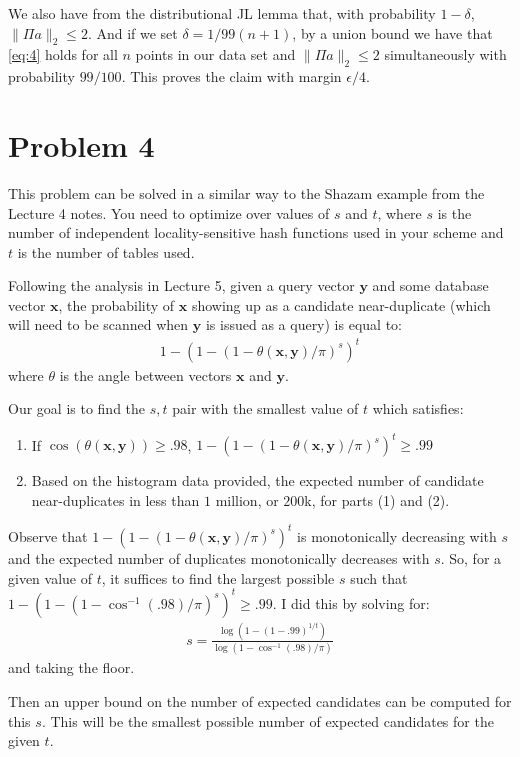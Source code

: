 \documentclass[11pt]{article}
\newcommand{\bv}[1]{\mathbf{#1}}
\begin{document}
	
	We also have from the distributional JL lemma that, with probability $1 - \delta$, $\|\Pi a\|_2 \leq 2$. And if we set $\delta = 1/99(n+1)$, by a union bound we have that \eqref{eq:4} holds for all $n$ points in our data set and $\|\Pi a\|_2 \leq 2$ simultaneously with probability $99/100$. This proves the claim with margin $\epsilon/4$. 
	
	\section*{Problem 4}
	This problem can be solved in a similar way to the Shazam example from the Lecture 4 notes. You need to optimize over values of $s$ and $t$, where $s$ is the number of independent locality-sensitive hash functions used in your scheme and $t$ is the number of tables used. 
	
	
	Following the analysis in Lecture 5, given a query vector $\bv{y}$ and some database vector $\bv{x}$, the probability of $\bv{x}$ showing up as a candidate near-duplicate (which will need to be scanned when $\bv{y}$ is issued as a query) is equal to:
	\begin{align}
		1- (1 - (1 - \theta(\bv{x},\bv{y})/\pi)^s)^t
	\end{align}
	where $\theta$ is the angle between vectors $\bv{x}$ and $\bv{y}$. 
	
	Our goal is to find the $s,t$ pair with the smallest value of $t$ which satisfies:
	\begin{enumerate}
		\item If $\cos(\theta(\bv{x},\bv{y})) \geq .98$, $1-(1 - (1 - \theta(\bv{x},\bv{y})/\pi)^s)^t \geq .99$
		\item Based on the histogram data provided, the expected number of candidate near-duplicates in less than $1$ million, or $200$k, for parts (1) and (2).
	\end{enumerate}
	
	Observe that $1-(1 - (1 - \theta(\bv{x},\bv{y})/\pi)^s)^t$ is monotonically decreasing with $s$ and the expected number of duplicates monotonically decreases with $s$. So, for a given value of $t$, it suffices to find the largest possible $s$ such that  $1-(1 - (1 - \cos^{-1}(.98)/\pi)^s)^t \geq .99$. I did this by solving for:
	\begin{align*}
		s = \frac{\log(1 - (1-.99)^{1/t})}{\log(1-\cos^{-1}(.98)/\pi)}
	\end{align*}
	and taking the floor. 
	
	Then an upper bound on the number of expected candidates can be computed for this $s$. This will be the smallest possible number of expected candidates for the given $t$. 
	
\end{document}
